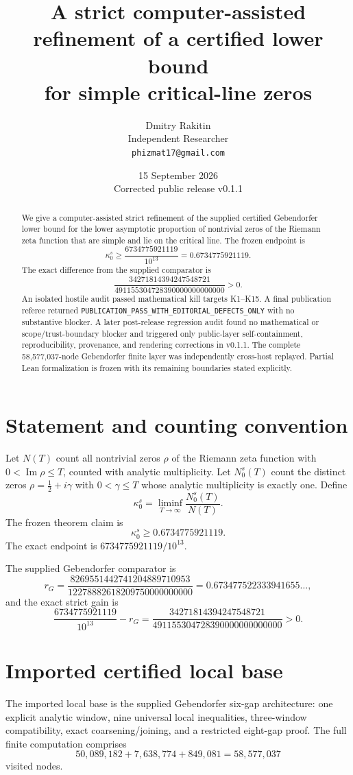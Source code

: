 \documentclass[11pt]{article}
\title{A strict computer-assisted refinement of a certified lower bound\\for simple critical-line zeros}
\author{Dmitry Rakitin\\Independent Researcher\\\texttt{phizmat17@gmail.com}}
\date{15 September 2026\\Corrected public release v0.1.1}
\begin{document}
\maketitle

\begin{abstract}
We give a computer-assisted strict refinement of the supplied certified Gebendorfer lower bound
for the lower asymptotic proportion of nontrivial zeros of the Riemann zeta function that are simple
and lie on the critical line. The frozen endpoint is
\[
\kappa_0^s\ge \frac{6734775921119}{10^{13}}=0.6734775921119.
\]
The exact difference from the supplied comparator is
\[
\frac{34271814394247548721}{491155304728390000000000000}>0.
\]
An isolated hostile audit passed mathematical kill targets K1--K15. A final publication referee
returned \texttt{PUBLICATION\_PASS\_WITH\_EDITORIAL\_DEFECTS\_ONLY} with no substantive blocker.
A later post-release regression audit found no mathematical or scope/trust-boundary blocker and
triggered only public-layer self-containment, reproducibility, provenance, and rendering corrections
in v0.1.1. The complete 58,577,037-node Gebendorfer finite layer was independently cross-host replayed.
Partial Lean formalization is frozen with its remaining boundaries stated explicitly.
\end{abstract}

\section{Statement and counting convention}
Let $N(T)$ count all nontrivial zeros $\rho$ of the Riemann zeta function with
$0<\operatorname{Im}\rho\le T$, counted with analytic multiplicity. Let $N_0^s(T)$
count the distinct zeros $\rho=\tfrac12+i\gamma$ with $0<\gamma\le T$ whose analytic
multiplicity is exactly one. Define
\[
\kappa_0^s=\liminf_{T\to\infty}\frac{N_0^s(T)}{N(T)}.
\]
The frozen theorem claim is
\[
\boxed{\kappa_0^s\ge 0.6734775921119}.
\]
The exact endpoint is $6734775921119/10^{13}$.

The supplied Gebendorfer comparator is
\[
r_G=\frac{8269551442741204889710953}{12278882618209750000000000}
=0.673477522333941655\ldots,
\]
and the exact strict gain is
\[
\frac{6734775921119}{10^{13}}-r_G
=\frac{34271814394247548721}{491155304728390000000000000}>0.
\]

\section{Imported certified local base}
The imported local base is the supplied Gebendorfer six-gap architecture: one explicit analytic
window, nine universal local inequalities, three-window compatibility, exact coarsening/joining,
and a restricted eight-gap proof. The full finite computation comprises
\[
50{,}089{,}182+7{,}638{,}774+849{,}081=58{,}577{,}037
\]
visited nodes.
\end{document}

